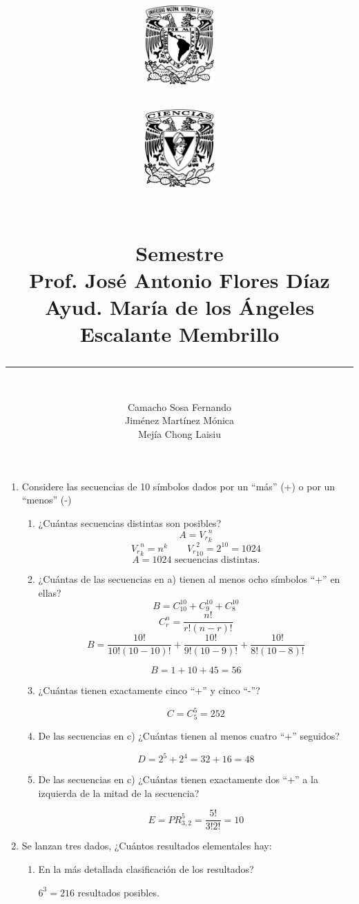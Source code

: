 \documentclass[letterpaper,11pt]{article}
\title{
    \begin{minipage}{0.5\textwidth}%
			\includegraphics[height=3cm, left]{unam.png}%
    \end{minipage}%
    \begin{minipage}{0.5\textwidth}%
			\includegraphics[height=3cm, right]{fciencias.png}%
    \end{minipage}

	\begin{center}
	\vspace{-134pt}
	\textbf{\Materia}\\[0.2cm]
	\large \textbf{ Semestre \Semestre }\\[0.2cm]
	Prof. José Antonio Flores Díaz\\ [0.2cm]													%
	Ayud. María de los Ángeles Escalante Membrillo\\ [0.2cm]													%
	\textbf{\TareaX}
	\end{center}
	\vspace{10pt}
	\rule{17cm}{0.3mm}
	\begin{flushright}
	\vspace{-3pt}
	\end{flushright}
}
\author{\vspace{-2cm} \\Camacho Sosa Fernando\\Jiménez Martínez Mónica\\Mejía Chong Laisiu}
\date{}
\renewcommand{%
	\contentsname}{\vspace{-1cm} \hfill\bfseries\LARGE Índice \hfill \vspace{0.2cm}%
}
\begin{document}
\maketitle

\begin{enumerate}

\item  Considere las secuencias de 10 símbolos dados por un ``más'' (+) o por un ``menos'' (-)

\begin{enumerate}
	\item ¿Cuántas secuencias distintas son posibles?
	$$
	A= {V_r}_k^n
	$$
	$$
	{V_r}_k^n =n^k \qquad {V_r}_{10}^2= 2^{10} = 1024
	$$
	$$
	A= 1024 \text{ secuencias distintas.}
	$$

	\item ¿Cuántas de las secuencias en a) tienen al menos ocho símbolos ``+'' en ellas?
	$$
	B= C_{10}^{10} + C_{9}^{10} + C_{8}^{10}
	$$
	$$
	C^n_r= \frac{n!}{r!(n-r)!}
	$$
	$$
	B= \frac{10!}{10!(10-10)!} + \frac{10!}{9!(10-9)!} + \frac{10!}{8!(10-8)!} 
	$$
	
	$$
	B= 1+10+45 = 56
	$$

	\item ¿Cuántas tienen exactamente cinco ``+'' y cinco ``-''?
	
	$$
	C = C^5_5 = 252
	$$

	\item De las secuencias en c) ¿Cuántas tienen al menos cuatro ``+'' seguidos?
	
	$$
	D = 2^5 + 2^4 = 32 + 16 = 48
	$$

	\item De las secuencias en c) ¿Cuántas tienen exactamente dos ``+'' a la izquierda de la mitad de la secuencia?
	
	$$
	E = PR^5_{3,2} = \frac{5!}{3!2!} = 10
	$$

\end{enumerate}

\item Se lanzan tres dados, ¿Cuántos resultados elementales hay: 
\begin{enumerate}
	\item En la más detallada clasificación de los resultados?
	
	$6^3 = 216$ resultados posibles. 


\end{enumerate}
\end{enumerate}
\end{document}

